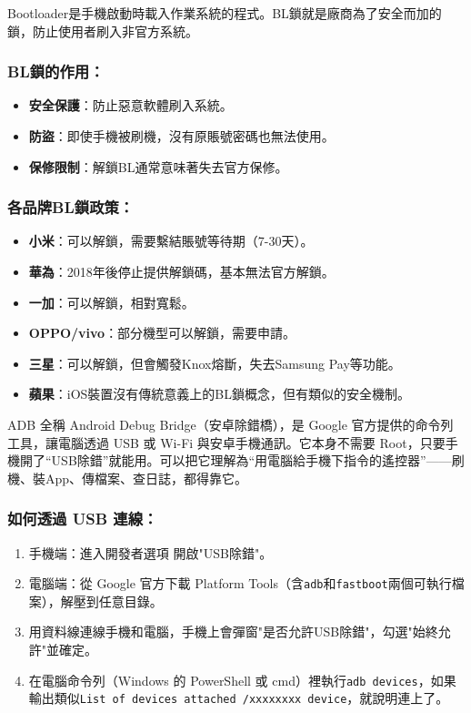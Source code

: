 
Bootloader是手機啟動時載入作業系統的程式。BL鎖就是廠商為了安全而加的鎖，防止使用者刷入非官方系統。

\subsubsection*{BL鎖的作用：}

\begin{itemize}
  \item \textbf{安全保護}：防止惡意軟體刷入系統。
  \item \textbf{防盜}：即使手機被刷機，沒有原賬號密碼也無法使用。
  \item \textbf{保修限制}：解鎖BL通常意味著失去官方保修。
\end{itemize}

\subsubsection*{各品牌BL鎖政策：}

\begin{itemize}
  \item \textbf{小米}：可以解鎖，需要繫結賬號等待期（7-30天）。
  \item \textbf{華為}：2018年後停止提供解鎖碼，基本無法官方解鎖。
  \item \textbf{一加}：可以解鎖，相對寬鬆。
  \item \textbf{OPPO/vivo}：部分機型可以解鎖，需要申請。
  \item \textbf{三星}：可以解鎖，但會觸發Knox熔斷，失去Samsung Pay等功能。
  \item \textbf{蘋果}：iOS裝置沒有傳統意義上的BL鎖概念，但有類似的安全機制。
\end{itemize}


ADB 全稱 Android Debug Bridge（安卓除錯橋），是 Google 官方提供的命令列工具，讓電腦透過 USB 或 Wi-Fi 與安卓手機通訊。它本身不需要 Root，只要手機開了“USB除錯”就能用。可以把它理解為“用電腦給手機下指令的遙控器”——刷機、裝App、傳檔案、查日誌，都得靠它。

\subsubsection*{如何透過 USB 連線：}

\begin{enumerate}
  \item 手機端：進入開發者選項 開啟"USB除錯"。
  \item 電腦端：從 Google 官方下載 Platform Tools（含\texttt{adb}和\texttt{fastboot}兩個可執行檔案），解壓到任意目錄。
  \item 用資料線連線手機和電腦，手機上會彈窗"是否允許USB除錯"，勾選"始終允許"並確定。
  \item 在電腦命令列（Windows 的 PowerShell 或 cmd）裡執行\texttt{adb devices}，如果輸出類似\texttt{List of devices attached /\allowbreak  xxxxxxxx device}，就說明連上了。
\end{enumerate}

